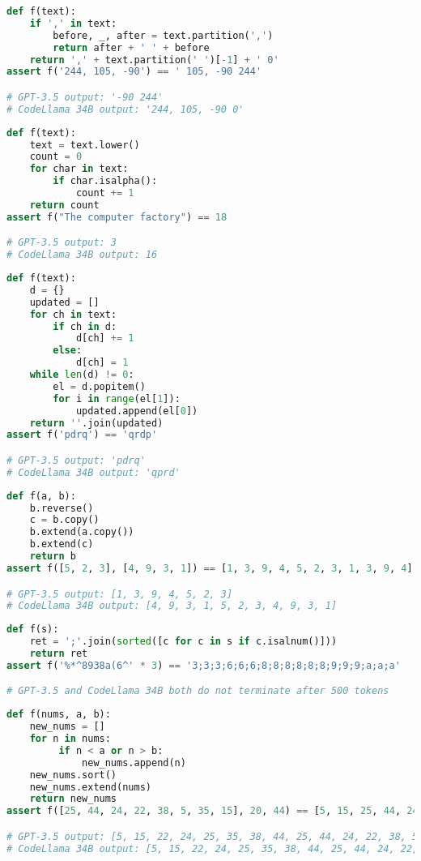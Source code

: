 \begin{lstlisting}[language=python]
def f(text):
    if ',' in text:
        before, _, after = text.partition(',')
        return after + ' ' + before
    return ',' + text.partition(' ')[-1] + ' 0'
assert f('244, 105, -90') == ' 105, -90 244'

# GPT-3.5 output: '-90 244'
# CodeLlama 34B output: '244, 105, -90 0'
\end{lstlisting}

\begin{lstlisting}[language=python]
def f(text):
    text = text.lower()
    count = 0
    for char in text:
        if char.isalpha():
            count += 1
    return count
assert f("The computer factory") == 18

# GPT-3.5 output: 3
# CodeLlama 34B output: 16
\end{lstlisting}

\begin{lstlisting}[language=python]
def f(text):
    d = {}
    updated = []
    for ch in text:
        if ch in d:
            d[ch] += 1
        else:
            d[ch] = 1
    while len(d) != 0:
        el = d.popitem()
        for i in range(el[1]):
            updated.append(el[0])
    return ''.join(updated)
assert f('pdrq') == 'qrdp'

# GPT-3.5 output: 'pdrq'
# CodeLlama 34B output: 'qprd'
\end{lstlisting}

\begin{lstlisting}[language=python]
def f(a, b):
    b.reverse()
    c = b.copy()
    b.extend(a.copy())
    b.extend(c)
    return b
assert f([5, 2, 3], [4, 9, 3, 1]) == [1, 3, 9, 4, 5, 2, 3, 1, 3, 9, 4]

# GPT-3.5 output: [1, 3, 9, 4, 5, 2, 3]
# CodeLlama 34B output: [4, 9, 3, 1, 5, 2, 3, 4, 9, 3, 1]
\end{lstlisting}

\begin{lstlisting}[language=python]
def f(s):
    ret = ';'.join(sorted([c for c in s if c.isalnum()]))
    return ret
assert f('%*^8938a(6^' * 3) == '3;3;3;6;6;6;8;8;8;8;8;8;9;9;9;a;a;a'

# GPT-3.5 and CodeLlama 34B both do not terminate after 500 tokens
\end{lstlisting}

\begin{lstlisting}[language=python]
def f(nums, a, b):
    new_nums = []
    for n in nums:
         if n < a or n > b:
             new_nums.append(n)
    new_nums.sort()
    new_nums.extend(nums)
    return new_nums
assert f([25, 44, 24, 22, 38, 5, 35, 15], 20, 44) == [5, 15, 25, 44, 24, 22, 38, 5, 35, 15]

# GPT-3.5 output: [5, 15, 22, 24, 25, 35, 38, 44, 25, 44, 24, 22, 38, 5, 35, 15]
# CodeLlama 34B output: [5, 15, 22, 24, 25, 35, 38, 44, 25, 44, 24, 22, 38, 5, 35, 15]
\end{lstlisting}

